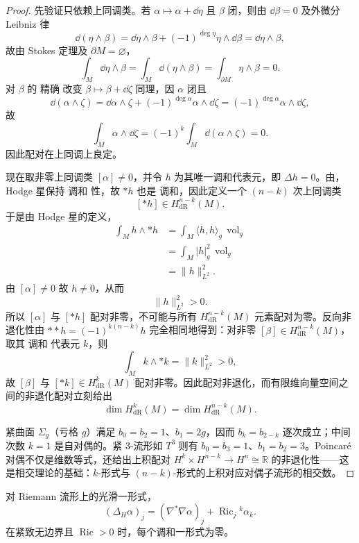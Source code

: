 \begin{proof}
先验证只依赖上同调类。若 $\alpha\mapsto\alpha+\dd\eta$ 且 $\beta$ 闭，则由 $\dd\beta=0$ 及外微分 Leibniz 律
\[
\dd(\eta\wedge\beta)
=\dd\eta\wedge\beta+(-1)^{\deg\eta}\eta\wedge\dd\beta
=\dd\eta\wedge\beta,
\]
故由 Stokes 定理及 $\partial M=\varnothing$，
\[
\int_M\dd\eta\wedge\beta
=\int_M\dd(\eta\wedge\beta)
=\int_{\partial M}\eta\wedge\beta
=0.
\]
对 $\beta$ 的 精确 改变 $\beta\mapsto\beta+\dd\zeta$ 同理，因 $\alpha$ 闭且
\[
\dd(\alpha\wedge\zeta)
=\dd\alpha\wedge\zeta+(-1)^{\deg\alpha}\alpha\wedge\dd\zeta
=(-1)^{\deg\alpha}\alpha\wedge\dd\zeta,
\]
故
\[
\int_M\alpha\wedge\dd\zeta
=(-1)^k\int_M\dd(\alpha\wedge\zeta)=0.
\]
因此配对在上同调上良定。

现在取非零上同调类 $[\alpha]\neq0$，并令 $h$ 为其唯一调和代表元，即 $\Delta h=0$。由，Hodge 星保持 调和 性，故 $*h$ 也是 调和，因此定义一个 $(n-k)$ 次上同调类
\[
[*h]\in H^{n-k}_{\mathrm{dR}}(M).
\]
于是由 Hodge 星的定义，
\begin{align*}
\int_M h\wedge *h
&=\int_M \langle h,h\rangle_g\,\operatorname{vol}_g\\
&=\int_M |h|_g^2\,\operatorname{vol}_g\\
&=\|h\|_{L^2}^2.
\end{align*}
由 $[\alpha]\neq0$ 故 $h\neq0$，从而
\[
\|h\|_{L^2}^2>0.
\]
所以 $[\alpha]$ 与 $[*h]$ 配对非零，不可能与所有 $H^{n-k}_{\mathrm{dR}}(M)$ 元素配对为零。反向非退化性由 $**h=(-1)^{k(n-k)}h$ 完全相同地得到：对非零 $[\beta]\in H^{n-k}_{\mathrm{dR}}(M)$，取其 调和 代表元 $k$，则
\[
\int_M k\wedge *k=\|k\|_{L^2}^2>0,
\]
故 $[\beta]$ 与 $[*k]\in H^k_{\mathrm{dR}}(M)$ 配对非零。因此配对非退化，而有限维向量空间之间的非退化配对立刻给出
\[
\dim H^k_{\mathrm{dR}}(M)
=\dim H^{n-k}_{\mathrm{dR}}(M).
\]

紧曲面 $\Sigma_g$（亏格 $g$）满足 $b_0=b_2=1$、$b_1=2g$，因而 $b_k=b_{2-k}$ 逐次成立；中间次数 $k=1$ 是自对偶的。紧 3-流形如 $T^3$ 则有 $b_0=b_3=1$、$b_1=b_2=3$。Poincaré 对偶不仅是维数等式，还给出上积配对 $H^k\times H^{n-k}\to H^n\cong\mathbb R$ 的非退化性——这是相交理论的基础：$k$-形式与 $(n-k)$-形式的上积对应对偶子流形的相交数。
\end{proof}

\begin{proposition}
对 Riemann 流形上的光滑一形式，\[(\Delta_H\alpha)_j=(\nabla^*\nabla\alpha)_j+\operatorname{Ric}_j{}^k\alpha_k.\]在紧致无边界且 $\operatorname{Ric}>0$ 时，每个调和一形式为零。
\end{proposition}

